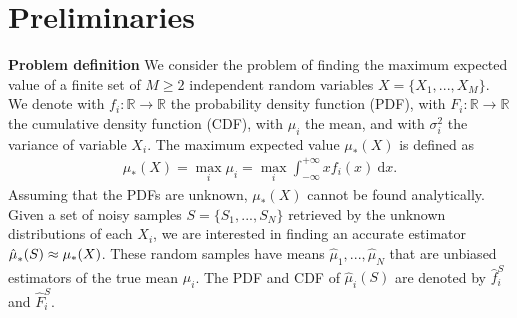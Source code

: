 \section{Preliminaries}\label{S:Preliminaries}

\textbf{Problem definition} We consider the problem of finding the maximum expected value of a finite set of $M \geq 2$ independent random variables $X = \lbrace X_{1}, ..., X_{M} \rbrace$.
We denote with $f_i : \mathbb{R} \rightarrow \mathbb{R}$ the probability density function (PDF), with $F_i : \mathbb{R} \rightarrow \mathbb{R}$ the cumulative density function (CDF), with $\mu_i$ the mean, and with $\sigma^2_i$ the variance of variable $X_i$.
The maximum expected value $\mu_{*}(X)$ is defined as
\begin{align}\label{eq:maxExp}
\mu_{*}(X) = \max_{i} \mu_{i} = \max_{i} \int_{-\infty}^{+\infty}xf_i(x)~\mathrm{d}x.
\end{align}
Assuming that the PDFs are unknown, $\mu_{*}(X)$ cannot be found analytically.
Given a set of noisy samples $S = \lbrace S_{1}, ..., S_{N} \rbrace$ retrieved by the unknown distributions of each $X_{i}$, we are interested in finding an accurate estimator $\hat\mu_*^{}(S) \approx \mu_{*}(X)$.
These random samples have means $\hat{\mu}_{1}, ..., \hat{\mu}_{N}$ that are unbiased estimators of the true mean $\mu_{i}$.
The PDF and CDF of $\hat{\mu}_{i}(S)$ are denoted by $\hat f_i^S$ and $\hat F_i^S$.


